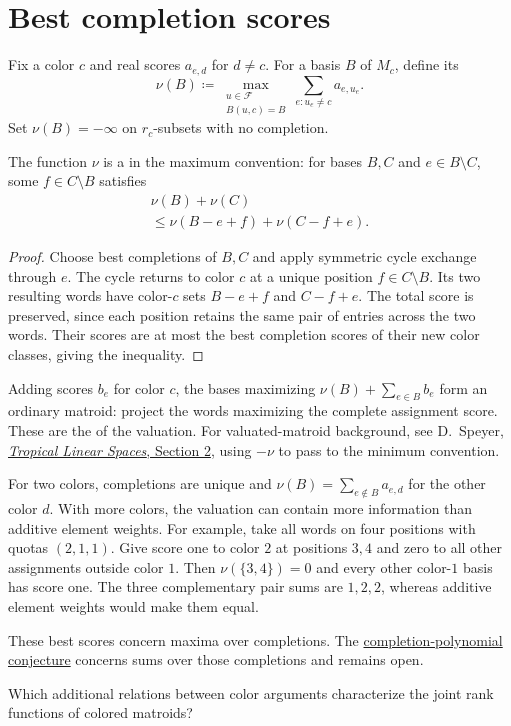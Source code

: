 \section[valuatedCompletions]{Best completion scores}

Fix a color $c$ and real scores $a_{e,d}$ for $d\ne c$.
For a basis $B$ of $M_c$, define its 
\[
 \nu(B)\coloneqq
 \max_{\substack{u\in\mathcal F\\B(u,c)=B}}
 \sum_{e:u_e\ne c}a_{e,u_e}.
\]
Set $\nu(B)=-\infty$ on $r_c$-subsets with no completion.

\begin{theorem}
The function $\nu$ is a  in the maximum
convention: for bases $B,C$ and $e\in B\setminus C$, some
$f\in C\setminus B$ satisfies
\[
 \begin{gathered}
 \nu(B)+\nu(C)\\
 \leq\nu(B-e+f)+\nu(C-f+e).
 \end{gathered}
\]
\end{theorem}

\begin{proof}
Choose best completions of $B,C$ and apply symmetric cycle exchange
through $e$. The cycle returns to color $c$ at a unique position
$f\in C\setminus B$. Its two resulting words have color-$c$ sets
$B-e+f$ and $C-f+e$. The total score is preserved, since each
position retains the same pair of entries across the two words.
Their scores are at most the best completion scores of their new
color classes, giving the inequality.
\end{proof}

Adding scores $b_e$ for color $c$, the bases maximizing
$\nu(B)+\sum_{e\in B}b_e$ form an ordinary matroid: project the
words maximizing the complete assignment score. These are the
 of the valuation. For valuated-matroid
background, see D.~Speyer,
\href{https://arxiv.org/html/math/0410455v1}{\emph{Tropical Linear
Spaces}, Section 2}, using $-\nu$ to pass to the minimum convention.

For two colors, completions are unique and
$\nu(B)=\sum_{e\notin B}a_{e,d}$ for the other color $d$.
With more colors, the valuation can contain more information than
additive element weights. For example, take all words on four
positions with quotas $(2,1,1)$. Give score one to color $2$ at
positions $3,4$ and zero to all other assignments outside color $1$.
Then $\nu(\{3,4\})=0$ and every other color-$1$ basis has score one.
The three complementary pair sums are $1,2,2$, whereas additive
element weights would make them equal.

These best scores concern maxima over completions. The
\href{rank.htm#lorentzianConjecture}{completion-polynomial conjecture}
concerns sums over those completions and remains open.

\begin{question}
Which additional relations between color arguments characterize
the joint rank functions of colored matroids?
\end{question}

